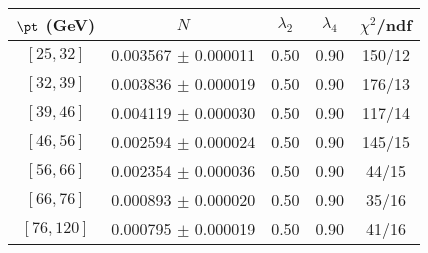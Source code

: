 \begin{tabular}{c||c|c|c|c}
$\pt$ (GeV) & $N$ & $\lambda_{2}$ & $\lambda_4$  & $\chi^2$/ndf  \\
\hline
$[25, 32]$ & 0.003567 $\pm$ 0.000011 & 0.50 & 0.90 & 150/12\\
$[32, 39]$ & 0.003836 $\pm$ 0.000019 & 0.50 & 0.90 & 176/13\\
$[39, 46]$ & 0.004119 $\pm$ 0.000030 & 0.50 & 0.90 & 117/14\\
$[46, 56]$ & 0.002594 $\pm$ 0.000024 & 0.50 & 0.90 & 145/15\\
$[56, 66]$ & 0.002354 $\pm$ 0.000036 & 0.50 & 0.90 & 44/15\\
$[66, 76]$ & 0.000893 $\pm$ 0.000020 & 0.50 & 0.90 & 35/16\\
$[76, 120]$ & 0.000795 $\pm$ 0.000019 & 0.50 & 0.90 & 41/16\\
\end{tabular}
